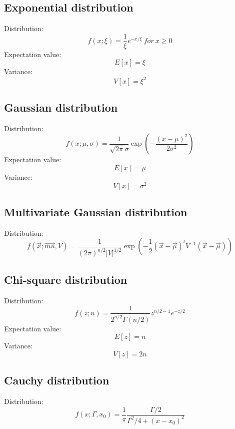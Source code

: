 \documentclass[12pt]{book}
\newcommand{\vx}{\vec{x}}
\begin{document}
\subsection{Exponential distribution}
Distribution:
\begin{equation}
	f(x;\xi) = \frac{1}{\xi}e^{-x/\xi} \ for \ x \geq 0
\end{equation}
Expectation value:
\begin{equation}
	E[x] = \xi
\end{equation}
Variance:
\begin{equation}
	V[x] = \xi^2
\end{equation}
\subsection{Gaussian distribution}
Distribution:
\begin{equation}
	f(x;\mu,\sigma) = \frac{1}{\sqrt{2\pi}\sigma}\exp\left(-\frac{(x-\mu)^2}{2\sigma^2}\right)
\end{equation}
Expectation value:
\begin{equation}
	E[x] = \mu
\end{equation}
Variance:
\begin{equation}
	V[x] = \sigma^2
\end{equation}
\subsection{Multivariate Gaussian distribution}
Distribution:
\begin{equation}
	f(\vx;\vec{mu},V) = \frac{1}{(2\pi)^{n/2}|V|^{1/2}}\exp\left(-\frac{1}{2}(\vx - \vec{\mu})^tV^{-1}(\vx - \vec{\mu})\right)
\end{equation}
\subsection{Chi-square distribution}
Distribution:
\begin{equation}
	f(z;n) = \frac{1}{2^{n/2}\Gamma(n/2)}z^{n/2-1}e^{-z/2}
\end{equation}
Expectation value:
\begin{equation}
	E[z] = n
\end{equation}
Variance:
\begin{equation}
	V[z] = 2n
\end{equation}
\subsection{Cauchy distribution}
Distribution:
\begin{equation}
	f(x;\Gamma,x_0) = \frac{1}{\pi}\frac{\Gamma/2}{\Gamma^2/4 + (x-x_0)^2}
\end{equation}
\end{document}
